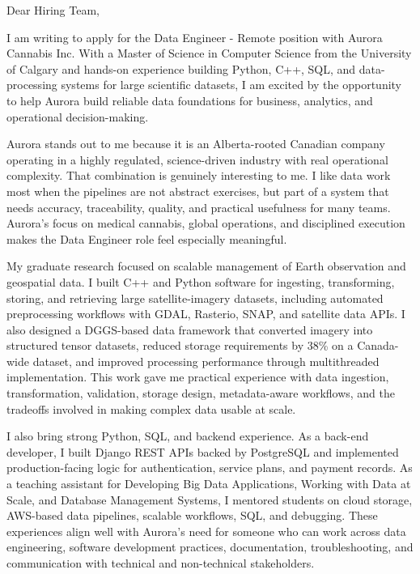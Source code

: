 \documentclass[11pt]{letter}
\begin{document}
\begin{letter}{}

\opening{Dear Hiring Team,}

I am writing to apply for the Data Engineer - Remote position with Aurora Cannabis Inc. With a Master of Science in Computer Science from the University of Calgary and hands-on experience building Python, C++, SQL, and data-processing systems for large scientific datasets, I am excited by the opportunity to help Aurora build reliable data foundations for business, analytics, and operational decision-making.

Aurora stands out to me because it is an Alberta-rooted Canadian company operating in a highly regulated, science-driven industry with real operational complexity. That combination is genuinely interesting to me. I like data work most when the pipelines are not abstract exercises, but part of a system that needs accuracy, traceability, quality, and practical usefulness for many teams. Aurora's focus on medical cannabis, global operations, and disciplined execution makes the Data Engineer role feel especially meaningful.

My graduate research focused on scalable management of Earth observation and geospatial data. I built C++ and Python software for ingesting, transforming, storing, and retrieving large satellite-imagery datasets, including automated preprocessing workflows with GDAL, Rasterio, SNAP, and satellite data APIs. I also designed a DGGS-based data framework that converted imagery into structured tensor datasets, reduced storage requirements by 38\% on a Canada-wide dataset, and improved processing performance through multithreaded implementation. This work gave me practical experience with data ingestion, transformation, validation, storage design, metadata-aware workflows, and the tradeoffs involved in making complex data usable at scale.

I also bring strong Python, SQL, and backend experience. As a back-end developer, I built Django REST APIs backed by PostgreSQL and implemented production-facing logic for authentication, service plans, and payment records. As a teaching assistant for Developing Big Data Applications, Working with Data at Scale, and Database Management Systems, I mentored students on cloud storage, AWS-based data pipelines, scalable workflows, SQL, and debugging. These experiences align well with Aurora's need for someone who can work across data engineering, software development practices, documentation, troubleshooting, and communication with technical and non-technical stakeholders.


\end{letter}
\end{document}
